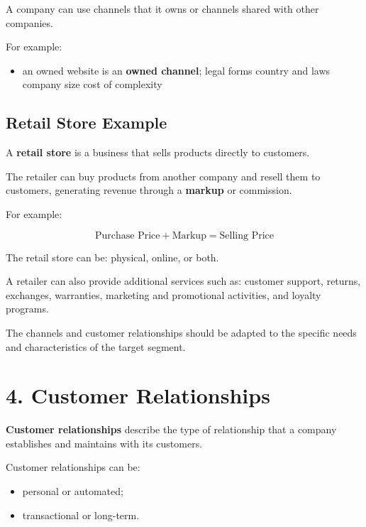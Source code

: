 \documentclass[12pt,a4paper]{report}
\begin{document}
A company can use channels that it owns or channels shared with other companies.

For example:

\begin{itemize}
    \item an owned website is an \textbf{owned channel};
    legal forms
    \newline
    country and laws
    \newline
    company size
    \newline
    cost of complexity
\end{itemize}

\subsection{Retail Store Example}

A \textbf{retail store} is a business that sells products directly to customers.

The retailer can buy products from another company and resell them to customers, generating revenue through a \textbf{markup} or commission.

For example:

\[
\text{Purchase Price} + \text{Markup} = \text{Selling Price}
\]

The retail store can be: physical, online, or both.

A retailer can also provide additional services such as: customer support, returns, exchanges, warranties, marketing and promotional activities, and loyalty programs.

The channels and customer relationships should be adapted to the specific needs and characteristics of the target segment.

\section{4. Customer Relationships}

\textbf{Customer relationships} describe the type of relationship that a company establishes and maintains with its customers.

Customer relationships can be:

\begin{itemize}
    \item personal or automated;
    \item transactional or long-term.
\end{itemize}
\end{document}
